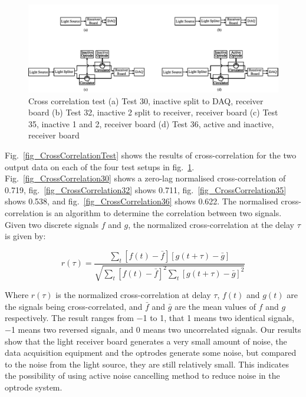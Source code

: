 \begin{figure}[h]
\centering
\includegraphics[width=0.9\linewidth]{4-ANC_Sys/CrossCoTest.pdf}
\caption{Cross correlation test (a) Test 30, inactive split to DAQ, receiver board (b) Test 32, inactive 2 split to receiver, receiver board (c) Test 35, inactive 1 and 2, receiver board (d) Test 36, active and inactive, receiver board}
\label{fig_CrossCoTest}
\end{figure}

Fig.~\ref{fig_CrossCorrelationTest} shows the results of cross-correlation for the two output data on each of the four test setups in fig.~\ref{fig_CrossCoTest}.  Fig.~\ref{fig_CrossCorrelation30} shows a zero-lag normalised cross-correlation of \qty{0.719}{}, fig.~\ref{fig_CrossCorrelation32} shows \qty{0.711}{}, fig.~\ref{fig_CrossCorrelation35} shows \qty{0.538}{}, and fig.~\ref{fig_CrossCorrelation36} shows \qty{0.622}{}.  The normalised cross-correlation is an algorithm to determine the correlation between two signals.  Given two discrete signals $f$ and $g$, the normalized cross-correlation at the delay $\tau$ is given by:

$$r(\tau) = \frac{\sum_{t} \left[ f(t) - \bar{f} \right] \left[ g(t + \tau) - \bar{g} \right]}{\sqrt{\sum_{t} \left[ f(t) - \bar{f} \right]^2 \sum_{t} \left[ g(t + \tau) - \bar{g} \right]^2}}
$$

Where $r(\tau)$ is the normalized cross-correlation at delay $\tau$, $f(t)$ and $g(t)$ are the signals being cross-correlated, and $\bar{f}$ and $\bar{g}$  are the mean values of $f$ and $g$ respectively.  The result ranges from \qty{-1}{} to \qty{1}{}, that \qty{1}{} means two identical signals, \qty{-1}{} means two reversed signals, and \qty{0}{} means two uncorrelated signals.  Our results show that the light receiver board generates a very small amount of noise, the data acquisition equipment and the optrodes generate some noise, but compared to the noise from the light source, they are still relatively small.  This indicates the possibility of using active noise cancelling method to reduce noise in the optrode system.

